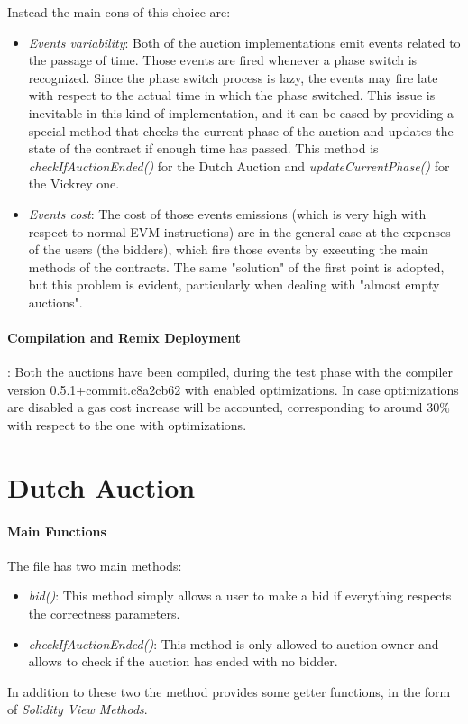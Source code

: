 \documentclass[11pt, a4paper]{report}
\begin{document}
	Instead the main cons of this choice are:
	\begin{itemize}
		\item \emph{Events variability}: Both of the auction implementations emit events related to the passage of time. Those events are fired whenever a phase switch is recognized. Since the phase switch process is lazy, the events may fire late with respect to the actual time in which the phase switched. This issue is inevitable in this kind of implementation, and it can be eased by providing a special method that checks the current phase of the auction and updates the state of the contract if enough time has passed. This method is \emph{checkIfAuctionEnded()} for the Dutch Auction and \emph{updateCurrentPhase()} for the Vickrey one.
		\item \emph{Events cost}: The cost of those events emissions (which is very high with respect to normal EVM instructions) are in the general case at the expenses of the users (the bidders), which fire those events by executing the main methods of the contracts. The same "solution" of the first point is adopted, but this problem is evident, particularly when dealing with "almost empty auctions".
	\end{itemize}

\paragraph*{Compilation and Remix Deployment}: Both the auctions have been compiled, during the test phase with the compiler version 0.5.1+commit.c8a2cb62 with enabled optimizations. In case optimizations are disabled a gas cost increase will be accounted, corresponding to around $30\%$ with respect to the one with optimizations.

\section*{Dutch Auction}
\label{sec:dutchAuction}

	\paragraph*{Main Functions}
	The file has two main methods:
	\begin{itemize}
		\item \emph{bid()}: This method simply allows a user to make a bid if everything respects the correctness parameters. 
		\item \emph{checkIfAuctionEnded()}: This method is only allowed to auction owner and allows to check if the auction has ended with no bidder.
	\end{itemize}
	In addition to these two the method provides some getter functions, in the form of \emph{Solidity View Methods}.
	
\end{document}
